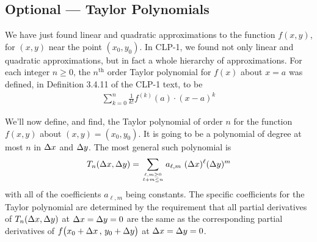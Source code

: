 \subsection{Optional --- Taylor Polynomials}\label{sec taylor}
We have just found linear and quadratic approximations
to the function $f(x,y)$, for $(x,y)$ near the point $(x_0,y_0)$.
In CLP-1, we found not only linear and quadratic approximations,
but in fact a whole hierarchy of approximations. For each
integer $n\ge 0$, the $n^\mathrm{th}$ order Taylor polynomial 
for $f(x)$ about $x=a$ was defined, in Definition 3.4.11 of the CLP-1 text,
to be
\begin{align*}
    \sum_{k=0}^n \frac{1}{k!} f^{(k)}(a) \cdot (x-a)^k
\end{align*}


We'll now define, and find, the Taylor polynomial of order $n$
for the function $f(x,y)$ about $(x,y)=(x_0,y_0)$. It is going
to be a polynomial of degree at most $n$ in $\Delta x$ and $\Delta y$. The most
general such polynomial is
\begin{equation*}
T_n(\De x,\De y)
  =\sum_{\Atop{\ell,m\ge 0}{\ell+m\le n}}  a_{\ell,m}\  (\De x)^\ell (\De y)^m
\end{equation*}
with all of the coefficients $a_{\ell,m}$ being constants. The 
specific coefficients for the Taylor polynomial are determined by the
requirement that all partial derivatives of $T_n(\Delta x,\Delta y)$
at $\Delta x=\Delta y=0$ are the same as the corresponding partial derivatives of 
$f\big(x_0 + \Delta x\,,\,y_0+\Delta y\big)$ at $\Delta x=\Delta y=0$. 



